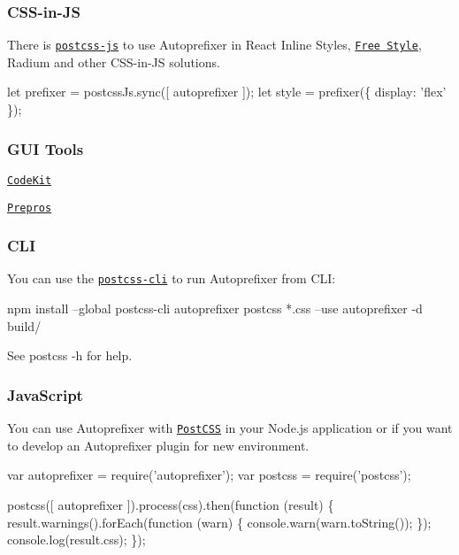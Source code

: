 \subsubsection*{C\+S\+S-\/in-\/\+JS}

There is \href{https://github.com/postcss/postcss-js}{\tt postcss-\/js} to use Autoprefixer in React Inline Styles, \href{https://github.com/blakeembrey/free-style}{\tt Free Style}, Radium and other C\+S\+S-\/in-\/\+JS solutions.


\begin{DoxyCode}
let prefixer = postcssJs.sync([ autoprefixer ]);
let style = prefixer(\{
    display: 'flex'
\});
\end{DoxyCode}


\subsubsection*{G\+UI Tools}


\begin{DoxyItemize}
\item \href{https://codekitapp.com/help/autoprefixer/}{\tt Code\+Kit}
\item \href{https://prepros.io}{\tt Prepros}
\end{DoxyItemize}

\subsubsection*{C\+LI}

You can use the \href{https://github.com/postcss/postcss-cli}{\tt postcss-\/cli} to run Autoprefixer from C\+LI\+:


\begin{DoxyCode}
npm install --global postcss-cli autoprefixer
postcss *.css --use autoprefixer -d build/
\end{DoxyCode}


See {\ttfamily postcss -\/h} for help.

\subsubsection*{Java\+Script}

You can use Autoprefixer with \href{https://github.com/postcss/postcss}{\tt Post\+C\+SS} in your Node.\+js application or if you want to develop an Autoprefixer plugin for new environment.


\begin{DoxyCode}
var autoprefixer = require('autoprefixer');
var postcss      = require('postcss');

postcss([ autoprefixer ]).process(css).then(function (result) \{
    result.warnings().forEach(function (warn) \{
        console.warn(warn.toString());
    \});
    console.log(result.css);
\});
\end{DoxyCode}


